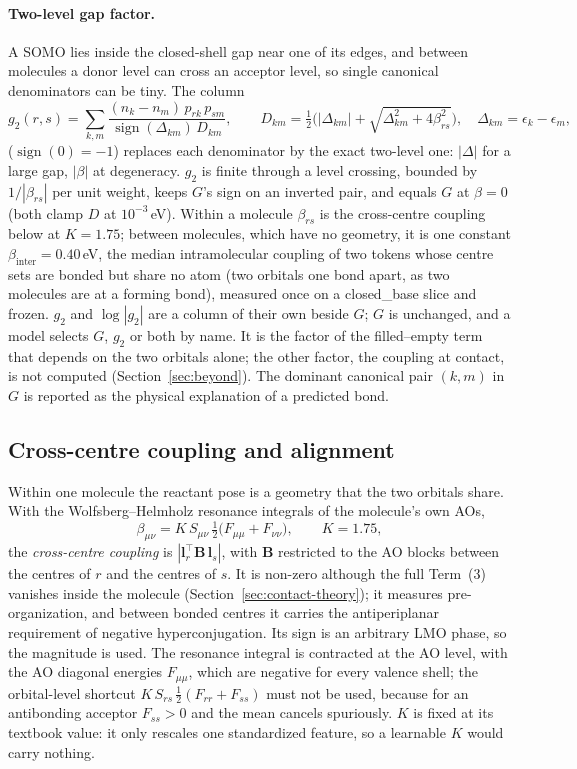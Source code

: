\documentclass[11pt,a4paper]{article}
\newcommand{\vb}[1]{\bm{#1}}
\begin{document}
\paragraph{Two-level gap factor.} A SOMO lies inside the closed-shell gap near one of its edges, and between molecules a donor level can cross an acceptor level, so single canonical denominators can be tiny. The column
\begin{equation}
g_2(r,s)=\sum_{k,m}\frac{(n_k-n_m)\,p_{rk}\,p_{sm}}{\operatorname{sign}(\Delta_{km})\,D_{km}},\qquad D_{km}=\tfrac12\Big(|\Delta_{km}|+\sqrt{\Delta_{km}^2+4\beta_{rs}^2}\Big),\quad \Delta_{km}=\epsilon_k-\epsilon_m,
\label{eq:g2}
\end{equation}
($\operatorname{sign}(0)=-1$) replaces each denominator by the exact two-level one: $|\Delta|$ for a large gap, $|\beta|$ at degeneracy. $g_2$ is finite through a level crossing, bounded by $1/|\beta_{rs}|$ per unit weight, keeps $G$'s sign on an inverted pair, and equals $G$ at $\beta=0$ (both clamp $D$ at $10^{-3}$\,eV). Within a molecule $\beta_{rs}$ is the cross-centre coupling below at $K=1.75$; between molecules, which have no geometry, it is one constant $\beta_{\mathrm{inter}}=0.40$\,eV, the median intramolecular coupling of two tokens whose centre sets are bonded but share no atom (two orbitals one bond apart, as two molecules are at a forming bond), measured once on a closed\_base slice and frozen. $g_2$ and $\log|g_2|$ are a column of their own beside $G$; $G$ is unchanged, and a model selects $G$, $g_2$ or both by name. It is the factor of the filled--empty term that depends on the two orbitals alone; the other factor, the coupling at contact, is not computed (Section~\ref{sec:beyond}). The dominant canonical pair $(k,m)$ in $G$ is reported as the physical explanation of a predicted bond.

\subsection{Cross-centre coupling and alignment}
Within one molecule the reactant pose is a geometry that the two orbitals share. With the Wolfsberg--Helmholz resonance integrals of the molecule's own AOs,
\begin{equation}
\beta_{\mu\nu}=K\,S_{\mu\nu}\,\tfrac12\big(F_{\mu\mu}+F_{\nu\nu}\big),\qquad K=1.75,
\end{equation}
the \emph{cross-centre coupling} is $|\vb{l}_r^{\!\top}\vb{B}\,\vb{l}_s|$, with $\vb{B}$ restricted to the AO blocks between the centres of $r$ and the centres of $s$. It is non-zero although the full Term~(3) vanishes inside the molecule (Section~\ref{sec:contact-theory}); it measures pre-organization, and between bonded centres it carries the antiperiplanar requirement of negative hyperconjugation. Its sign is an arbitrary LMO phase, so the magnitude is used. The resonance integral is contracted at the AO level, with the AO diagonal energies $F_{\mu\mu}$, which are negative for every valence shell; the orbital-level shortcut $K\,S_{rs}\,\tfrac12(F_{rr}+F_{ss})$ must not be used, because for an antibonding acceptor $F_{ss}>0$ and the mean cancels spuriously. $K$ is fixed at its textbook value: it only rescales one standardized feature, so a learnable $K$ would carry nothing.
\end{document}
